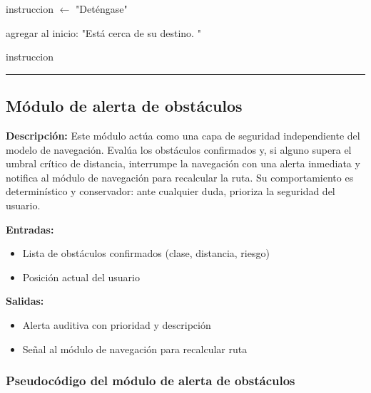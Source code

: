 \begin{algorithmic}[1]
    \EndIf

\EndIf

\Statex


    \State instruccion $\gets$ "Deténgase"

\EndIf

\Statex
{}

    \State agregar al inicio:
    "Está cerca de su destino. "

\EndIf

\Statex
\State \Return instruccion

\end{algorithmic}
\vspace{-0.9cm}
\rule{\textwidth}{0.4pt}

\subsection{Módulo de alerta de obstáculos}

\textbf{Descripción:}
Este módulo actúa como una capa de seguridad independiente del modelo de navegación.
Evalúa los obstáculos confirmados y, si alguno supera el umbral crítico de distancia,
interrumpe la navegación con una alerta inmediata y notifica al módulo de navegación
para recalcular la ruta. Su comportamiento es determinístico y conservador: ante
cualquier duda, prioriza la seguridad del usuario.

\textbf{Entradas:}
\begin{itemize}
    \item Lista de obstáculos confirmados (clase, distancia, riesgo)
    \item Posición actual del usuario
\end{itemize}

\textbf{Salidas:}
\begin{itemize}
    \item Alerta auditiva con prioridad y descripción
    \item Señal al módulo de navegación para recalcular ruta
\end{itemize}

\subsubsection{Pseudocódigo del módulo de alerta de obstáculos}

